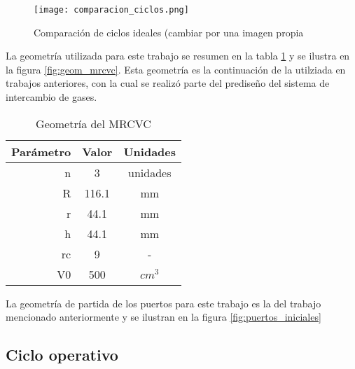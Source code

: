 \begin{figure}
    \centering
    \texttt{[image: comparacion\_ciclos.png]}
    \caption{Comparación de ciclos ideales (cambiar por una imagen propia}
    \label{fig:comparacion_ciclos}
\end{figure}

La geometría utilizada para este trabajo se resumen en la tabla
\ref{tab:geom_mrcvc} y se ilustra en la figura \ref{fig:geom_mrcvc}.
%
Esta geometría es la continuación de la utilziada en trabajos anteriores, con
la cual se realizó parte del prediseño del sistema de intercambio de gases.

\begin{table}
    \centering
    \begin{tabular}{rcc} \toprule
        Parámetro & Valor & Unidades \\ \midrule
        n & 3 & unidades \\
        R & 116.1 & mm \\
        r & 44.1 & mm \\
        h & 44.1 & mm \\
        rc & 9 & - \\
        V0 & 500 & $cm^3$ \\
    \end{tabular}
    \caption{Geometría del MRCVC}
    \label{tab:geom_mrcvc}
\end{table}

La geometría de partida de los puertos para este trabajo es la del trabajo
mencionado anteriormente y se ilustran en la figura \ref{fig:puertos_iniciales}




\subsection{Ciclo operativo}


